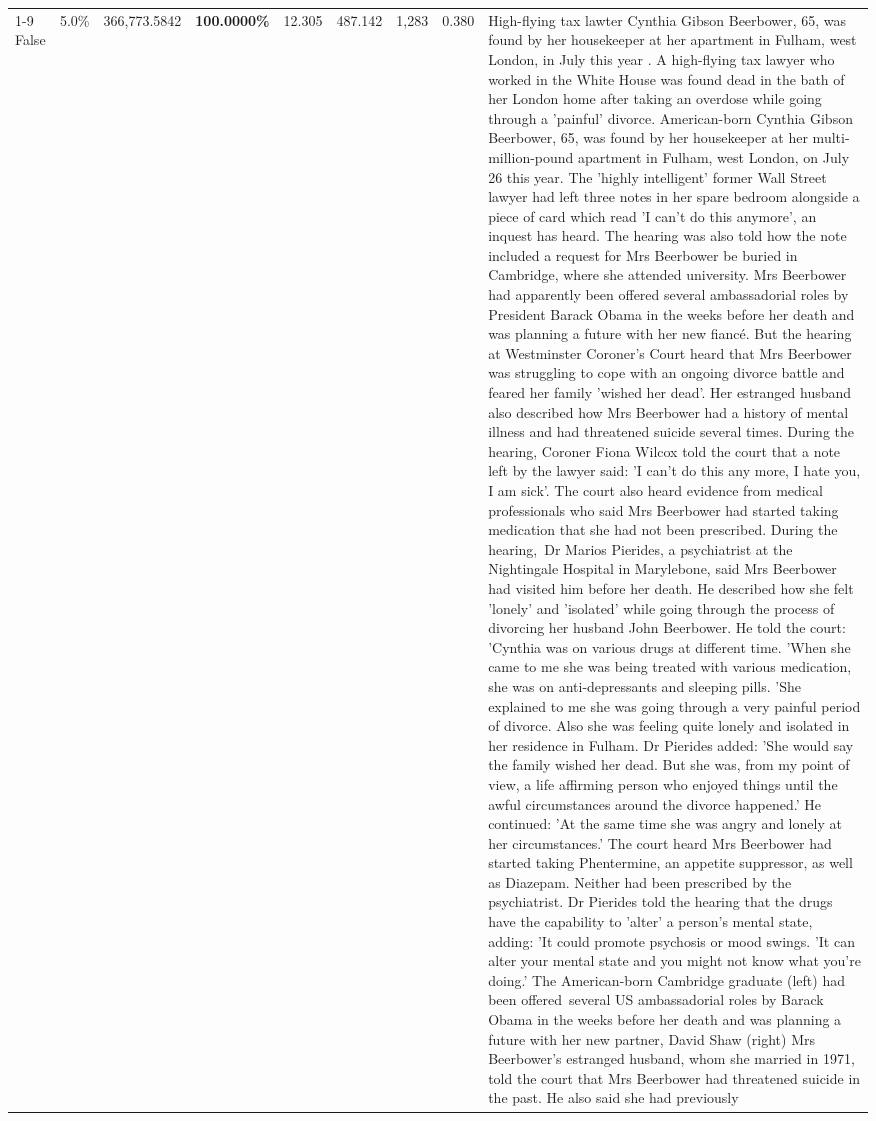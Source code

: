 \begin{table}[H]
\begin{tabular}{lllrlllll}
\cline{1-9}
False & 5.0\% & 366,773.5842 & \bfseries \color{red} 100.0000\% & 12.305 & 487.142 & 1,283 & 0.380 & High-flying tax lawter Cynthia Gibson Beerbower, 65, was found by her housekeeper at her apartment in Fulham, west London, in July this year . A high-flying tax lawyer who worked in the White House was found dead in the bath of her London home after taking an overdose while going through a 'painful' divorce. American-born Cynthia Gibson Beerbower, 65, was found by her housekeeper at her multi-million-pound apartment in Fulham, west London, on July 26 this year. The 'highly intelligent' former Wall Street lawyer had left three notes in her spare bedroom alongside a piece of card which read 'I can't do this anymore', an inquest has heard. The hearing was also told how the note included a request for Mrs Beerbower be buried in Cambridge, where she attended university. Mrs Beerbower had apparently been offered several ambassadorial roles by President Barack Obama in the weeks before her death and was planning a future with her new fiancé. But the hearing at Westminster Coroner's Court heard that Mrs Beerbower was struggling to cope with an ongoing divorce battle and feared her family 'wished her dead'. Her estranged husband also described how Mrs Beerbower had a history of mental illness and had threatened suicide several times. During the hearing, Coroner Fiona Wilcox told the court that a note left by the lawyer said: 'I can't do this any more, I hate you, I am sick'. The court also heard evidence from medical professionals who said Mrs Beerbower had started taking medication that she had not been prescribed. During the hearing, Dr Marios Pierides, a psychiatrist at the Nightingale Hospital in Marylebone, said Mrs Beerbower had visited him before her death. He described how she felt 'lonely' and 'isolated' while going through the process of divorcing her husband John Beerbower. He told the court: 'Cynthia was on various drugs at different time. 'When she came to me she was being treated with various medication, she was on anti-depressants and sleeping pills. 'She explained to me she was going through a very painful period of divorce. Also she was feeling quite lonely and isolated in her residence in Fulham. Dr Pierides added: 'She would say the family wished her dead. But she was, from my point of view, a life affirming person who enjoyed things until the awful circumstances around the divorce happened.' He continued: 'At the same time she was angry and lonely at her circumstances.' The court heard Mrs Beerbower had started taking Phentermine, an appetite suppressor, as well as Diazepam. Neither had been prescribed by the psychiatrist. Dr Pierides told the hearing that the drugs have the capability to 'alter' a person's mental state, adding: 'It could promote psychosis or mood swings. 'It can alter your mental state and you might not know what you're doing.' The American-born Cambridge graduate (left) had been offered several US ambassadorial roles by Barack Obama in the weeks before her death and was planning a future with her new partner, David Shaw (right) Mrs Beerbower's estranged husband, whom she married in 1971, told the court that Mrs Beerbower had threatened suicide in the past. He also said she had previously 
\end{tabular}
\end{table}
